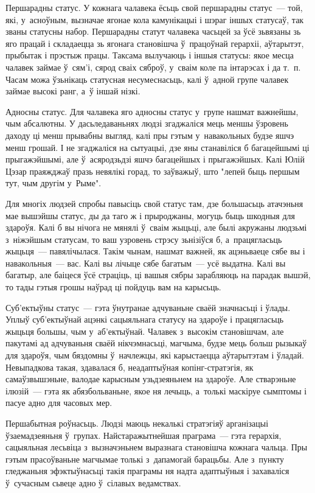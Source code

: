 Першарадны статус. У кожнага чалавека ёсьць свой першарадны статус~--- той, які, у~асноўным, вызначае ягонае кола камунікацыі і шэраг іншых статусаў, так званы статусны набор. Першарадны статут чалавека часьцей за ўсё зьвязаны зь яго працай і складаецца зь ягонага становішча ў~працоўнай герархіі, аўтарытэт, прыбытак і прэстыж працы. Таксама вылучаюць і іншыя статусы: якое месца чалавек займае ў~сям'і, сярод сваіх сяброў, у~сваім коле па інтарэсах і да т.~п. Часам можа ўзьнікаць статусная несумеснасьць, калі ў~адной групе чалавек займае высокі ранг, а~ў іншай нізкі.

Адносны статус. Для чалавека яго адносны статус у~групе нашмат важнейшы, чым абсалютны. У дасьледаваньнях людзі згаджаліся мець меншы ўзровень даходу ці менш прывабны выгляд, калі пры гэтым у~навакольных будзе яшчэ менш грошай. І не згаджаліся на сытуацыі, дзе яны станавіліся б багацейшымі ці прыгажэйшымі, але ў~асяродзьдзі яшчэ багацейшых і прыгажэйшых. Калі Юлій Цэзар праяжджаў празь невялікі горад, то заўважыў, што "лепей быць першым тут, чым другім у~Рыме".

Для многіх людзей спробы павысіць свой статус там, дзе большасьць атачэньня мае вышэйшы статус, ды да таго ж і прыроджаны, могуць быць шкодныя для здароўя. Калі б вы нічога не мянялі ў~сваім жыцьці, але былі акружаны людзьмі з~ніжэйшым статусам, то ваш узровень стрэсу зьнізіўся б, а~працягласьць жыцьця~--- павялічылася. Такім чынам, нашмат важней, як ацэньваеце сябе вы і навакольныя~--- вас. Калі вы лічыце сябе багатым~--- усё выдатна. Калі вы багатыр, але баіцеся ўсё страціць, ці вашыя сябры зарабляюць на парадак вышэй, то тады гэтыя грошы наўрад ці пойдуць вам на карысьць.

Суб'ектыўны статус~--- гэта ўнутранае адчуваньне сваёй значнасьці і ўлады. Уплыў суб'ектыўнай ацэнкі сацыяльнага статусу на здароўе і працягласьць жыцьця большы, чым у~аб'ектыўнай. Чалавек з~высокім становішчам, але пакутамі ад адчуваньня сваёй нікчэмнасьці, магчыма, будзе мець больш рызыкаў для здароўя, чым бяздомны ў~начлежцы, які карыстаецца аўтарытэтам і ўладай. Невыпадкова такая, здавалася б, неадаптыўная копінг-стратэгія, як самаўзвышэньне, валодае карысным узьдзеяньнем на здароўе. Але стварэньне ілюзій~--- гэта як абязбольваньне, якое ня лечыць, а~толькі маскіруе сымптомы і пасуе адно для часовых мер.

Першабытная роўнасьць. Людзі маюць некалькі стратэгіяў арганізацыі ўзаемадзеяньня ў~групах. Найстаражытнейшая праграма~--- гэта герархія, сацыяльная лесьвіца з~вызначэньнем выразнага становішча кожнага чальца. Пры гэтым прасоўваньне магчымае толькі з~дапамогай барацьбы. Але з~пункту гледжаньня эфэктыўнасьці такія праграмы ня надта адаптыўныя і захаваліся ў~сучасным сьвеце адно ў~сілавых ведамствах.

